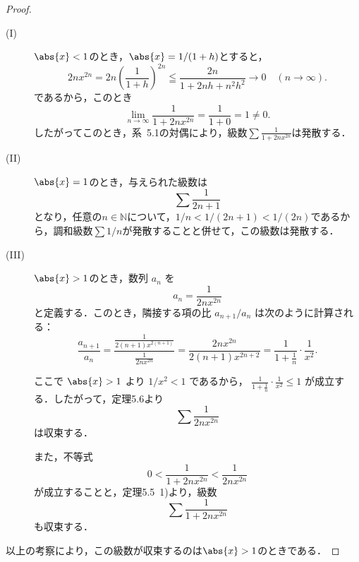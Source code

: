 \documentclass[a4paper,10pt,fleqn]{ltjsarticle}
\begin{document}
\begin{leftbar}
    \begin{proof}
        \begin{description}
            \item[(I)] $ \abs{x}<1$のとき，$\abs{x}=1/(1+h)$とすると，
                  \[
                      2n x^{2n} = 2n \left( \frac{1}{1+h} \right)^{2n}
                      \leqq \frac{2n}{1+2nh+n^2h^2}
                      \to 0 \quad (n \to \infty).
                  \]
                  であるから，このとき
                  \[
                      \lim_{n \to \infty} \frac{1}{1+2nx^{2n}}  = \frac{1}{1+0}
                      = 1
                      \ne 0.
                  \]
                  したがってこのとき，系~5.1の対偶により，級数$\sum \frac{1}{1+2nx^{2n}}$は発散する．
            \item [(II)] $ \abs{x}=1$のとき，与えられた級数は
                  \[
                      \sum \frac{1}{2n+1}
                  \]
                  となり，任意の$n \in \mathbb{N}$について，$ 1/n < 1/(2n+1) < 1/(2n)$であるから，調和級数$\sum 1/n$が発散することと併せて，この級数は発散する．
            \item [(III)] $ \abs{x}>1$のとき，数列 $a_n$ を
                  \[
                      a_n = \frac{1}{2n x^{2n}}
                  \]
                  と定義する．このとき，隣接する項の比 $a_{n+1} / a_n$ は次のように計算される：
                  \[
                      \frac{a_{n+1}}{a_n} = \frac{\frac{1}{2(n+1)x^{2(n+1)}}}{\frac{1}{2n x^{2n}}}
                      = \frac{2n x^{2n}}{2(n+1)x^{2n+2}}
                      = \frac{1}{1 + \frac{1}{n}} \cdot \frac{1}{x^2}.
                  \]

                  ここで $\abs{x} > 1$ より $1/x^2 < 1$ であるから，
                  $\frac{1}{1 + \frac{1}{n}} \cdot \frac{1}{x^2} \leq 1$ が成立する．したがって，定理5.6より
                  \[
                      \sum  \frac{1}{2n x^{2n}}
                  \]
                  は収束する．

                  また，不等式
                  \[
                      0 < \frac{1}{1 + 2n x^{2n}} < \frac{1}{2n x^{2n}}
                  \]
                  が成立することと，定理5.5~1)より，級数
                  \[
                      \sum \frac{1}{1 + 2n x^{2n}}
                  \]
                  も収束する．
        \end{description}
        以上の考察により，この級数が収束するのは$\abs{x}>1$のときである．
    \end{proof}
\end{leftbar}
\end{document}
